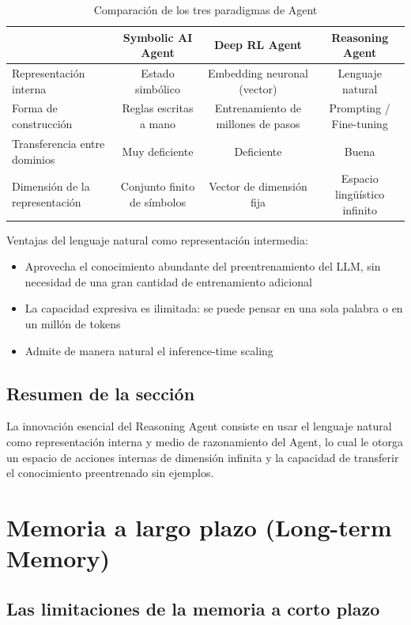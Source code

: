 \documentclass[a4paper]{article}
\begin{document}
\begin{table}[H]
\centering
\begin{tabular}{lccc}
\toprule
& \textbf{Symbolic AI Agent} & \textbf{Deep RL Agent} & \textbf{Reasoning Agent} \\
\midrule
Representación interna & Estado simbólico & Embedding neuronal (vector) & Lenguaje natural \\
Forma de construcción & Reglas escritas a mano & Entrenamiento de millones de pasos & Prompting / Fine-tuning \\
Transferencia entre dominios & Muy deficiente & Deficiente & Buena \\
Dimensión de la representación & Conjunto finito de símbolos & Vector de dimensión fija & Espacio lingüístico infinito \\
\bottomrule
\end{tabular}
\caption{Comparación de los tres paradigmas de Agent}
\end{table}

Ventajas del lenguaje natural como representación intermedia:
\begin{itemize}
    \item Aprovecha el conocimiento abundante del preentrenamiento del LLM, sin necesidad de una gran cantidad de entrenamiento adicional
    \item La capacidad expresiva es ilimitada: se puede pensar en una sola palabra o en un millón de tokens
    \item Admite de manera natural el inference-time scaling
\end{itemize}

\subsection{Resumen de la sección}

La innovación esencial del Reasoning Agent consiste en usar el lenguaje natural como representación interna y medio de razonamiento del Agent, lo cual le otorga un espacio de acciones internas de dimensión infinita y la capacidad de transferir el conocimiento preentrenado sin ejemplos.

\section{Memoria a largo plazo (Long-term Memory)}

\subsection{Las limitaciones de la memoria a corto plazo}
\end{document}
